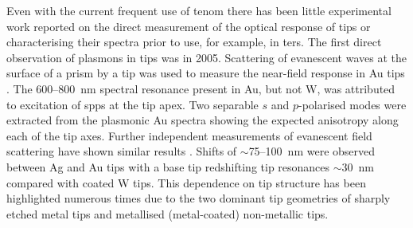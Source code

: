 \documentclass{article}
\begin{document}


Even with the current frequent use of \gls{tenom} there has been little experimental work reported on the direct measurement of the optical response of tips or characterising their spectra prior to use, for example, in \gls{ters}. The first direct observation of plasmons in tips was in 2005. Scattering of evanescent waves at the surface of a prism by a tip was used to measure the near-field response in Au tips \cite{neacsu2005}. The 600--\SI{800}{nm} spectral resonance present in Au, but not W, was attributed to excitation of \glspl{spp} at the tip apex. Two separable $s$ and $p$-polarised modes were extracted from the plasmonic Au spectra showing the expected anisotropy along each of the tip axes.
Further independent measurements of evanescent field scattering have shown similar results \cite{mehtani2006, barrios2009}. Shifts of $\sim$75--\SI{100}{nm} were observed between Ag and Au tips with a  base tip redshifting tip resonances $\sim$\SI{30}{nm} compared with coated W tips. This dependence on tip structure has been highlighted numerous times due to the two dominant tip geometries of sharply etched metal tips and metallised (metal-coated) non-metallic tips.
\end{document}
